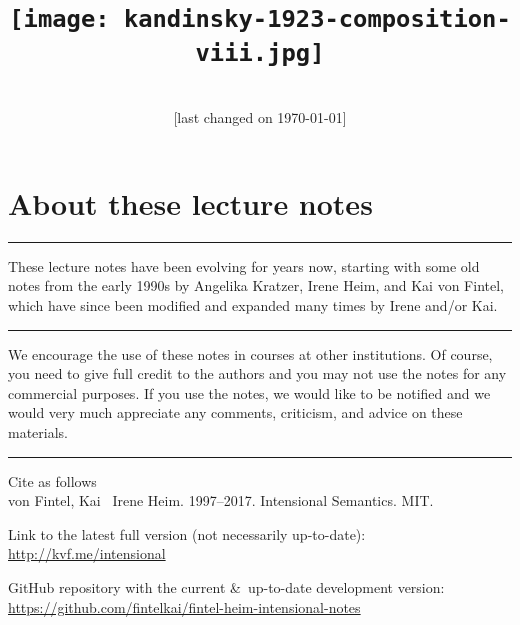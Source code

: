 \frontmatter

\title{\\[36pt]\texttt{[image: kandinsky-1923-composition-viii.jpg]}}
\author{\and{}}
\date{\\[18pt] [last changed on \today]}

\pagestyle{empty}


\maketitle

\cleardoublepage

\section*{About these lecture notes}

\plainbreak{1} 

These lecture notes have been evolving for years now, starting with some old
notes from the early 1990s by Angelika Kratzer, Irene Heim, and Kai von Fintel,
which have since been modified and expanded many times by Irene and/or Kai.

\plainbreak{1} 

We encourage the use of these notes in courses at other institutions. Of course,
you need to give full credit to the authors and you may not use the notes for
any commercial purposes. If you use the notes, we would like to be notified and
we would very much appreciate any comments, criticism, and advice on these
materials.

\plainbreak{1}

Cite as follows\\[6pt]\null\hfill
von Fintel, Kai \amp\ Irene Heim. 1997--2017. Intensional Semantics. MIT.

\medskip

\noindent Link to the latest full version (not necessarily up-to-date):\\[6pt]
                                             \null\hfill\url{http://kvf.me/intensional}
\medskip
                                            
\noindent GitHub repository with the current \&\ up-to-date development version:\\[6pt]
            \null\hfill\url{https://github.com/fintelkai/fintel-heim-intensional-notes}

\medskip


